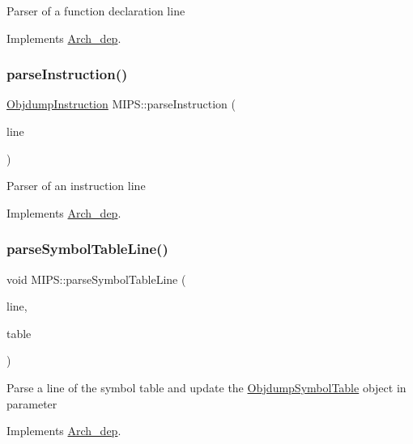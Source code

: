 Parser of a function declaration line 

Implements \hyperlink{classArch__dep_a5d004c41d6eaf7975b69f767a52d2e30}{Arch\+\_\+dep}.

\mbox{\label{classMIPS_a8a3bbe0cf81cf032f3e8e1d1786c888f}} 
\subsubsection{\texorpdfstring{parse\+Instruction()}{parseInstruction()}}
{\footnotesize\ttfamily \hyperlink{classObjdumpInstruction}{Objdump\+Instruction} M\+I\+P\+S\+::parse\+Instruction (\begin{DoxyParamCaption}\item[{const string \&}]{line }\end{DoxyParamCaption})\hspace{0.3cm}{\ttfamily [virtual]}}

Parser of an instruction line 

Implements \hyperlink{classArch__dep_a6408104eb77881932f05dab9e913ca87}{Arch\+\_\+dep}.

\mbox{\label{classMIPS_ae63e651cee1687716908f3c9f66d9f3f}} 
\subsubsection{\texorpdfstring{parse\+Symbol\+Table\+Line()}{parseSymbolTableLine()}}
{\footnotesize\ttfamily void M\+I\+P\+S\+::parse\+Symbol\+Table\+Line (\begin{DoxyParamCaption}\item[{const string \&}]{line,  }\item[{\hyperlink{classObjdumpSymbolTable}{Objdump\+Symbol\+Table} \&}]{table }\end{DoxyParamCaption})\hspace{0.3cm}{\ttfamily [virtual]}}

Parse a line of the symbol table and update the \hyperlink{classObjdumpSymbolTable}{Objdump\+Symbol\+Table} object in parameter 

Implements \hyperlink{classArch__dep_a5d50b1a54bf2afc034b813d1008c9f8e}{Arch\+\_\+dep}.


